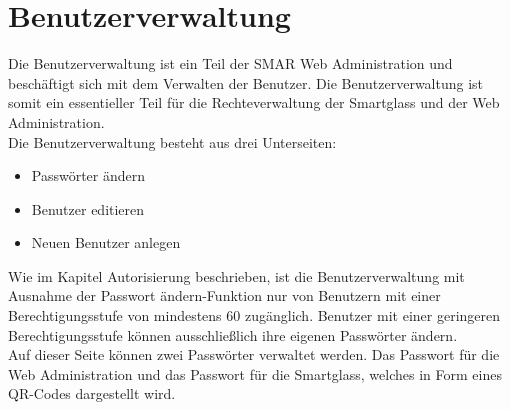 \section{Benutzerverwaltung}
Die Benutzerverwaltung ist ein Teil der \ac{SMAR} Web Administration und beschäftigt sich mit dem Verwalten der Benutzer. Die Benutzerverwaltung ist somit ein essentieller Teil für die Rechteverwaltung der Smartglass und der Web Administration.\\

Die Benutzerverwaltung besteht aus drei Unterseiten:
\begin{itemize}
	\item Passwörter ändern
	\item Benutzer editieren
	\item Neuen Benutzer anlegen
\end{itemize}
Wie im Kapitel Autorisierung beschrieben, ist die Benutzerverwaltung mit Ausnahme der \glqq Passwort ändern\grqq -Funktion nur von Benutzern mit einer Berechtigungsstufe von mindestens 60 zugänglich. Benutzer mit einer geringeren Berechtigungsstufe können ausschließlich ihre eigenen Passwörter ändern.\\

Auf dieser Seite können zwei Passwörter verwaltet werden. Das Passwort für die Web Administration und das Passwort für die Smartglass, welches in Form eines QR-Codes dargestellt wird.\\

